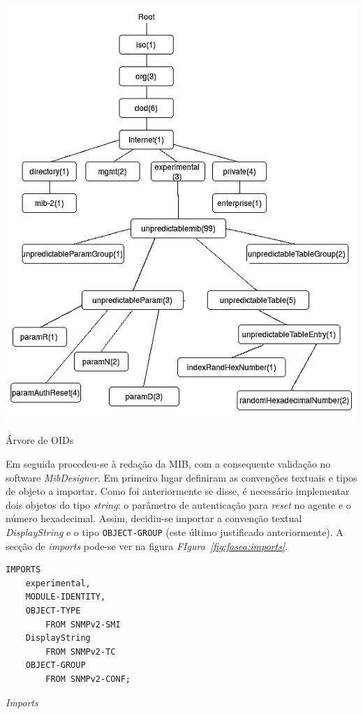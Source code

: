  
\begin{center}
 	
	\includegraphics[width=\textwidth,height=\textheight,keepaspectratio]{resources/images/faseA/arvoreOID.png}
 	\captionsetup{type=figure, width=0.8\linewidth}
	\caption{Árvore de OIDs}
\label{fig:fasea:arvoreoids} 
\end{center}



Em seguida procedeu-se à redação da MIB, com a consequente validação no software
\emph{MibDesigner}. Em primeiro lugar definiram as convenções textuais e tipos
de objeto a importar. Como foi anteriormente se disse, é necessário implementar
dois objetos do tipo \emph{string}: o parâmetro de autenticação para
\emph{reset} no agente e o número hexadecimal. Assim, decidiu-se importar
a convenção textual \emph{DisplayString} e o tipo \texttt{OBJECT-GROUP} (este
último justificado anteriormente). A secção de \emph{imports} pode-se ver na
figura \emph{FIgura~\ref{fig:fasea:imports}}.  

\begin{center}
 	
\begin{verbatim}
IMPORTS
	experimental,
	MODULE-IDENTITY,
	OBJECT-TYPE
		FROM SNMPv2-SMI
	DisplayString
		FROM SNMPv2-TC
	OBJECT-GROUP
		FROM SNMPv2-CONF;
\end{verbatim}
 	\captionsetup{type=figure, width=0.8\linewidth}
	\caption{\emph{Imports} }
\label{fig:fasea:imports} 
\end{center}



